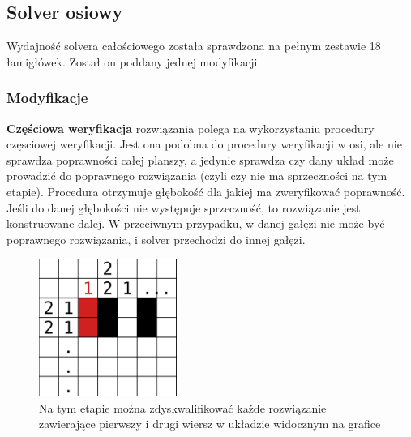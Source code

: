 \subsection{Solver osiowy}
    Wydajność solvera całościowego została sprawdzona na pełnym zestawie 18 łamigłówek. Został
on poddany jednej modyfikacji.

\subsubsection{Modyfikacje}
    \textbf{Częściowa weryfikacja} rozwiązania polega na wykorzystaniu procedury częsciowej weryfikacji.
Jest ona podobna do procedury weryfikacji w osi, ale nie sprawdza poprawności całej planszy,
a jedynie sprawdza czy dany układ może prowadzić do poprawnego rozwiązania (czyli czy nie ma sprzeczności na tym etapie).
Procedura otrzymuje głębokość dla jakiej ma zweryfikować poprawność. Jeśli do danej głębokości nie
występuje sprzeczność, to rozwiązanie jest konstruowane dalej. W przeciwnym przypadku, w danej gałęzi
nie może być poprawnego rozwiązania, i solver przechodzi do innej gałęzi.

\begin{figure}[!htb]
    \centering
    \includegraphics[width=0.4\textwidth]{images/partial_check_example.png}
    \caption{Na tym etapie można zdyskwalifikować każde rozwiązanie zawierające pierwszy i drugi wiersz
w układzie widocznym na grafice}
\end{figure}




